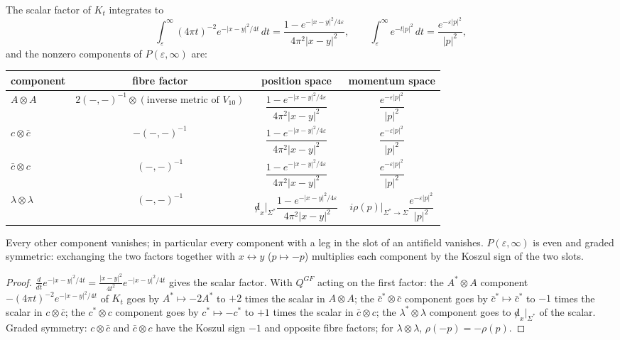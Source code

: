 \begin{proposition}
\label{prop:c3-P}
The scalar factor of $K_t$ integrates to
\[
\int_\varepsilon^\infty(4\pi t)^{-2}e^{-|x-y|^2/4t}\,dt=\frac{1-e^{-|x-y|^2/4\varepsilon}}{4\pi^2|x-y|^2},\qquad \int_\varepsilon^\infty e^{-t|p|^2}\,dt=\frac{e^{-\varepsilon|p|^2}}{|p|^2},
\]
and the nonzero components of $P(\varepsilon,\infty)$ are:

\begin{tabular}{l|c|c|c}
component & fibre factor & position space & momentum space \\
\hline
$A\otimes A$ & $2(-,-)^{-1}\otimes(\text{inverse metric of }V_{10})$ & $\dfrac{1-e^{-|x-y|^2/4\varepsilon}}{4\pi^2|x-y|^2}$ & $\dfrac{e^{-\varepsilon|p|^2}}{|p|^2}$ \\
$c\otimes\bar c$ & $-(-,-)^{-1}$ & $\dfrac{1-e^{-|x-y|^2/4\varepsilon}}{4\pi^2|x-y|^2}$ & $\dfrac{e^{-\varepsilon|p|^2}}{|p|^2}$ \\
$\bar c\otimes c$ & $(-,-)^{-1}$ & $\dfrac{1-e^{-|x-y|^2/4\varepsilon}}{4\pi^2|x-y|^2}$ & $\dfrac{e^{-\varepsilon|p|^2}}{|p|^2}$ \\
$\lambda\otimes\lambda$ & $(-,-)^{-1}$ & ${\not d}_x|_{\Sigma^*}\dfrac{1-e^{-|x-y|^2/4\varepsilon}}{4\pi^2|x-y|^2}$ & $i\rho(p)|_{\Sigma^*\to\Sigma}\dfrac{e^{-\varepsilon|p|^2}}{|p|^2}$ \\
\end{tabular}

Every other component vanishes; in particular every component with a leg in the slot of an antifield vanishes. $P(\varepsilon,\infty)$ is even and graded symmetric: exchanging the two factors together with $x\leftrightarrow y$ ($p\mapsto-p$) multiplies each component by the Koszul sign of the two slots.
\end{proposition}

\begin{proof}
$\frac{d}{dt}e^{-|x-y|^2/4t}=\frac{|x-y|^2}{4t^2}e^{-|x-y|^2/4t}$ gives the scalar factor. With $Q^{GF}$ acting on the first factor: the $A^*\otimes A$ component $-(4\pi t)^{-2}e^{-|x-y|^2/4t}$ of $K_t$ goes by $A^*\mapsto-2A^*$ to $+2$ times the scalar in $A\otimes A$; the $\bar c^*\otimes\bar c$ component goes by $\bar c^*\mapsto\bar c^*$ to $-1$ times the scalar in $c\otimes\bar c$; the $c^*\otimes c$ component goes by $c^*\mapsto-c^*$ to $+1$ times the scalar in $\bar c\otimes c$; the $\lambda^*\otimes\lambda$ component goes to ${\not d}_x|_{\Sigma^*}$ of the scalar. Graded symmetry: $c\otimes\bar c$ and $\bar c\otimes c$ have the Koszul sign $-1$ and opposite fibre factors; for $\lambda\otimes\lambda$, $\rho(-p)=-\rho(p)$.
\end{proof}

